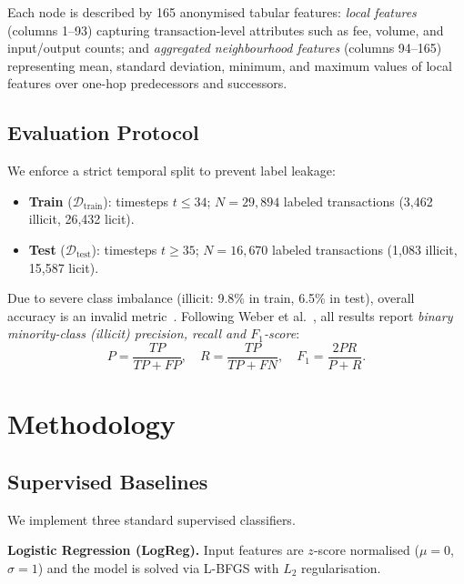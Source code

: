\documentclass[conference]{IEEEtran}
\begin{document}
Each node is described by 165 anonymised tabular features:
\textit{local features} (columns 1--93) capturing transaction-level
attributes such as fee, volume, and input/output counts; and
\textit{aggregated neighbourhood features} (columns 94--165) representing
mean, standard deviation, minimum, and maximum values of local features over
one-hop predecessors and successors.

\subsection{Evaluation Protocol}
\label{sec:eval}

We enforce a strict temporal split to prevent label leakage:
\begin{itemize}
  \item \textbf{Train} ($\mathcal{D}_{\text{train}}$): timesteps
    $t \leq 34$; $N = 29{,}894$ labeled transactions (3,462 illicit,
    26,432 licit).
  \item \textbf{Test} ($\mathcal{D}_{\text{test}}$): timesteps
    $t \geq 35$; $N = 16{,}670$ labeled transactions (1,083 illicit,
    15,587 licit).
\end{itemize}

Due to severe class imbalance (illicit: 9.8\% in train, 6.5\% in test),
overall accuracy is an invalid metric~\cite{adnan2026statistical}.
Following Weber et al.~\cite{weber2019anti}, all results report
\emph{binary minority-class (illicit) precision, recall and $F_1$-score}:
\begin{equation}
  P = \frac{TP}{TP{+}FP},\quad
  R = \frac{TP}{TP{+}FN},\quad
  F_1 = \frac{2PR}{P{+}R}.
  \label{eq:metrics}
\end{equation}

\section{Methodology}
\label{sec:method}

\subsection{Supervised Baselines}

We implement three standard supervised classifiers.

\smallskip\noindent\textbf{Logistic Regression (LogReg).}
Input features are $z$-score normalised ($\mu=0$, $\sigma=1$) and the
model is solved via L-BFGS with $L_2$ regularisation.
\end{document}

